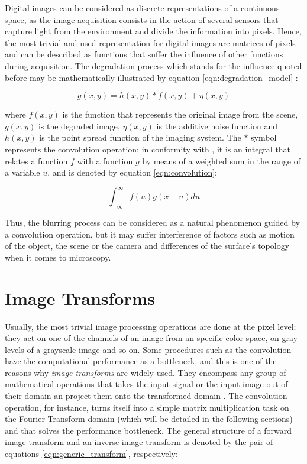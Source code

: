 Digital images can be considered as discrete representations of a continuous space, as the image acquisition consists in the action of several sensors that capture light from the environment and divide the information into pixels. Hence, the most trivial and used representation for digital images are matrices of pixels and can be described as functions that suffer the influence of other functions during acquisition. The degradation process which stands for the influence quoted before may be mathematically illustrated by equation \ref{eqn:degradation_model} \cite{gonzalez2008digital}:

\begin{equation}
    \label{eqn:degradation_model}
       g(x,y) = h(x,y) \ast f(x,y) + \eta(x,y)
\end{equation}

\noindent where $f(x,y)$ is the function that represents the original image from the scene, $g(x,y)$ is the degraded image, $\eta(x,y)$ is the additive noise function and $h(x,y)$ is the point spread function of the imaging system. The $\ast$ symbol represents the convolution operation: in conformity with , it is an integral that relates a function $f$ with a function $g$ by means of a weighted sum in the range of a variable $u$, and is denoted by equation \ref{eqn:convolution}:

\begin{equation}
    \label{eqn:convolution}
       \int^{\infty}_{-\infty}f(u)g(x - u)du
\end{equation}

Thus, the blurring process can be considered as a natural phenomenon guided by a convolution operation, but it may suffer interference of factors such as motion of the object, the scene or the camera and differences of the surface's topology when it comes to microscopy. 

\section{Image Transforms}

Usually, the most trivial image processing operations are done at the pixel level; they act on one of the channels of an image from an specific color space, on gray levels of a grayscale image and so on. Some procedures such as the convolution have the computational performance as a bottleneck, and this is one of the reasons why \emph{image transforms} are widely used. They encompass any group of mathematical operations that takes the input signal or the input image out of their domain an project them onto the transformed domain \cite{gonzalez2008digital}. The convolution operation, for instance, turns itself into a simple matrix multiplication task on the Fourier Transform domain (which will be detailed in the following sections) and that solves the performance bottleneck. The general structure of a forward image transform and an inverse image transform is denoted by  the pair of equations \ref{eqn:generic_transform}, respectively:


